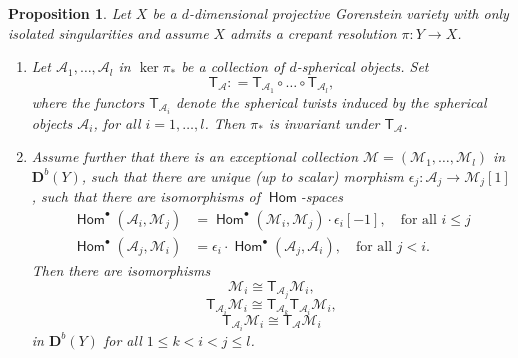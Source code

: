 \documentclass[a4paper,11pt, reqno]{amsart}
\def\DD{\mathbf D}
\def\sA{\mathscr{A}}
\def\sM{\mathscr{M}}
\newcommand{\opname}[1]{\operatorname{\mathsf{#1}}}
\newcommand{\Hom}{\opname{Hom}}
\def\Db{\DD^b}
\newcommand{\bT}{\mathsf{T}}
\theoremstyle{plain}
\newtheorem{proposition}[dummy]{Proposition}
\theoremstyle{definition}
\numberwithin{equation}{section}
\begin{document}
\begin{proposition}\label{prop:spherical}
Let $X$ be a $d$-dimensional projective Gorenstein variety with only isolated singularities and assume $X$ admits a  crepant resolution $\pi : Y \to X$.
\begin{enumerate}[label=(\alph*)]
    \item\label{prop:spherical-a} Let $\sA_1 , \ldots, \sA_l$ in $\ker \pi_\ast$ be a collection of $d$-spherical objects. 
    Set
    \[
       \bT_{\sA} : = \bT_{\sA_1} \circ \ldots \circ \bT_{\sA_l} ,
    \]
    where the functors $\bT_{\sA_i}$ denote the spherical twists induced by the spherical objects $\sA_i$, for all $i = 1 , \ldots , l$.
    Then $\pi_\ast$ is invariant under $\bT_{\sA}$.

\item\label{prop:spherical-b} Assume further that there is an exceptional collection $\sM = ( \sM_1 , \ldots , \sM_l )$ in $\Db(Y)$, such that there are unique (up to scalar) morphism $\epsilon_j \colon \sA_j \to \sM_j [1]$, such that there are isomorphisms of $\Hom$-spaces
\begin{align}
    \Hom^\bullet ( \sA_i , \sM_j ) & = \Hom^\bullet (\sM_i , \sM_j ) \cdot \epsilon_i [-1] , \quad \text{for all $i\leq j$}\label{eq:assump1} \\
    \Hom^\bullet ( \sA_j , \sM_i ) & = \epsilon_i \cdot \Hom^\bullet ( \sA_j , \sA_i ) , \quad \text{for all $j<i$} .\label{eq:assump2} 
\end{align}
        Then there are isomorphisms
        \begin{equation}\label{eq:j-bigger-i}
    \sM_i \cong \bT_{\sA_j} \sM_i ,
\end{equation}
        \begin{equation}\label{eq:j-lower-i}
    \bT_{\sA_i} \sM_i \cong \bT_{\sA_k} \bT_{\sA_i} \sM_i ,
\end{equation}
\begin{equation}\label{eq:j-equal-i}
    \bT_{\sA_i } \sM_i \cong \bT_{\sA} \sM_i
\end{equation}
        in $\Db(Y)$ for all $1\leq k<i<j \leq l $.
\end{enumerate}
\end{proposition}
\end{document}
